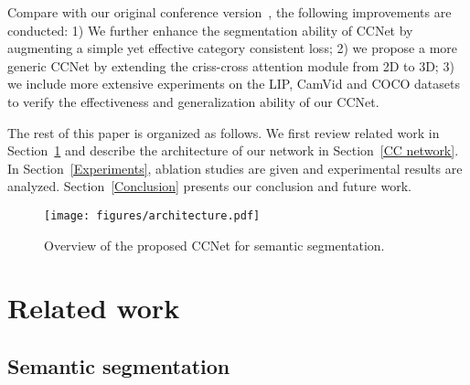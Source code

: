 \documentclass[10pt,journal,compsoc]{IEEEtran}
\begin{document}
Compare with our original conference version~\cite{huang2018ccnet}, the following improvements are conducted: 1) We further enhance the segmentation ability of CCNet by augmenting a simple yet effective category consistent loss; 2) we propose a more generic CCNet by extending the criss-cross attention module from 2D to 3D; 3) we include more extensive experiments on the LIP, CamVid and COCO datasets to verify the effectiveness and generalization ability of our CCNet.

The rest of this paper is organized as follows. We first
review related work in Section~\ref{Related work} and describe the architecture of our network in Section~\ref{CC network}. In Section~\ref{Experiments}, ablation studies are given and experimental results are analyzed. Section~\ref{Conclusion} presents our conclusion and future work.

\begin{figure*}[!t]
    \centering
    \texttt{[image: figures/architecture.pdf]}
    \caption{Overview of the proposed CCNet for semantic segmentation.
    }
    \label{fig:architecture}
\end{figure*}

\section{Related work} \label{Related work}

\subsection{Semantic segmentation} 
\end{document}
